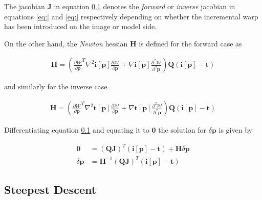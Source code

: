 The jacobian $\mathbf{J}$ in equation \ref{} denotes the \emph{forward} or \emph{inverse} jacobian in equations \ref{eq:} and \ref{eq:} respectively depending on whether the incremental warp has been introduced on the image or model side.

On the other hand, the \emph{Newton} hessian $\mathbf{H}$ is defined for the forward case as

\begin{equation}
	\begin{aligned}
		\mathbf{H} = \left( \frac{\partial \mathcal{W}}{\partial \mathbf{p}}^T \nabla^2 \mathbf{i}[\mathbf{p}] \frac{\partial \mathcal{W}}{\partial \mathbf{p}} + 
		\nabla \mathbf{i}[\mathbf{p}] \frac{\partial^2 \mathcal{W}}{\partial^2 \mathbf{p}} \right)
		\mathbf{Q} \left( \mathbf{i}[\mathbf{p}] - \mathbf{t} \right)
	\end{aligned}
\end{equation}

and similarly for the inverse case

\begin{equation}
	\begin{aligned}
		\mathbf{H} = \left( \frac{\partial \mathcal{W}}{\partial \mathbf{p}}^T \nabla^2 \mathbf{t}[\mathbf{p}] \frac{\partial \mathcal{W}}{\partial \mathbf{p}} + 
		\nabla \mathbf{t}[\mathbf{p}] \frac{\partial^2 \mathcal{W}}{\partial^2 \mathbf{p}} \right)
		\mathbf{Q} \left( \mathbf{i}[\mathbf{p}] - \mathbf{t} \right)
	\end{aligned}
\end{equation}

Differentiating equation \ref{} and equating it to $\mathbf{0}$ the solution for $\delta \mathbf{p}$ is given by

\begin{equation}
	\begin{aligned}
		 \mathbf{0} & = \left( \mathbf{Q} \mathbf{J} \right)^T \left( \mathbf{i}[\mathbf{p}] - \mathbf{t} \right) + \mathbf{H} \delta \mathbf{p}
		\\
		\delta \mathbf{p} & = \mathbf{H}^{-1} \left( \mathbf{Q} \mathbf{J} \right)^T \left( \mathbf{i}[\mathbf{p}] - \mathbf{t} \right)
	\end{aligned}
\end{equation}

\subsection{Steepest Descent}

